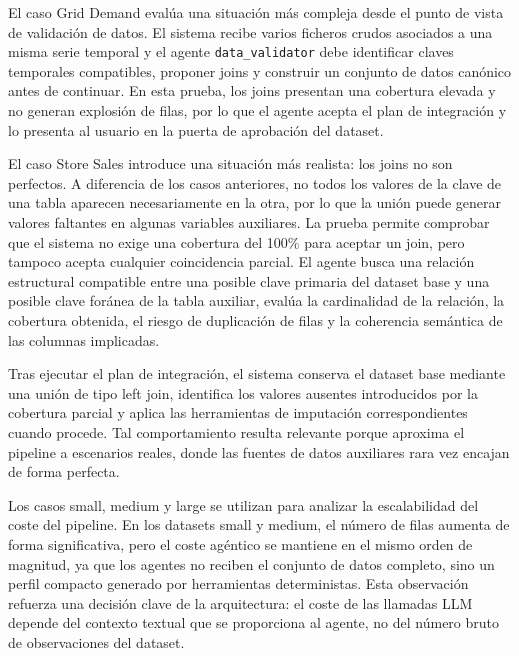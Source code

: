 \documentclass[12pt,a4paper]{article}
\theoremstyle{plain}
\begin{document}
El caso Grid Demand evalúa una situación más compleja desde el punto de vista de validación de datos. El sistema recibe varios ficheros crudos asociados a una misma serie temporal y el agente \texttt{data\_validator} debe identificar claves temporales compatibles, proponer joins y construir un conjunto de datos canónico antes de continuar. En esta prueba, los joins presentan una cobertura elevada y no generan explosión de filas, por lo que el agente acepta el plan de integración y lo presenta al usuario en la puerta de aprobación del dataset. %

El caso Store Sales introduce una situación más realista: los joins no son perfectos. A diferencia de los casos anteriores, no todos los valores de la clave de una tabla aparecen necesariamente en la otra, por lo que la unión puede generar valores faltantes en algunas variables auxiliares. La prueba permite comprobar que el sistema no exige una cobertura del 100\% para aceptar un join, pero tampoco acepta cualquier coincidencia parcial. El agente busca una relación estructural compatible entre una posible clave primaria del dataset base y una posible clave foránea de la tabla auxiliar, evalúa la cardinalidad de la relación, la cobertura obtenida, el riesgo de duplicación de filas y la coherencia semántica de las columnas implicadas.

Tras ejecutar el plan de integración, el sistema conserva el dataset base mediante una unión de tipo left join, identifica los valores ausentes introducidos por la cobertura parcial y aplica las herramientas de imputación correspondientes cuando procede. Tal comportamiento resulta relevante porque aproxima el pipeline a escenarios reales, donde las fuentes de datos auxiliares rara vez encajan de forma perfecta.

Los casos small, medium y large se utilizan para analizar la escalabilidad del coste del pipeline. En los datasets small y medium, el número de filas aumenta de forma significativa, pero el coste agéntico se mantiene en el mismo orden de magnitud, ya que los agentes no reciben el conjunto de datos completo, sino un perfil compacto generado por herramientas deterministas. Esta observación refuerza una decisión clave de la arquitectura: el coste de las llamadas LLM depende del contexto textual que se proporciona al agente, no del número bruto de observaciones del dataset. %
\end{document}
